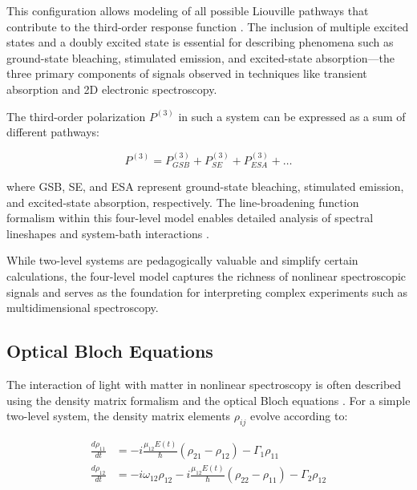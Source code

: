 \noindent This configuration allows modeling of all possible Liouville pathways that contribute to the third-order response function \cite{Mukamel1995PrinciplesNonlinearOptical}. The inclusion of multiple excited states and a doubly excited state is essential for describing phenomena such as ground-state bleaching, stimulated emission, and excited-state absorption—the three primary components of signals observed in techniques like transient absorption and 2D electronic spectroscopy.

\noindent The third-order polarization $P^{(3)}$ in such a system can be expressed as a sum of different pathways:

\begin{equation}
    P^{(3)} = P^{(3)}_{GSB} + P^{(3)}_{SE} + P^{(3)}_{ESA} + \ldots
    \label{eq:third_order_contributions}
\end{equation}

\noindent where GSB, SE, and ESA represent ground-state bleaching, stimulated emission, and excited-state absorption, respectively. The line-broadening function formalism within this four-level model enables detailed analysis of spectral lineshapes and system-bath interactions \cite{Cho2009TwodimensionalOpticalSpectroscopy, AbramaviciusEtAl2009CoherentMultidimensionalOptical}.

\noindent While two-level systems are pedagogically valuable and simplify certain calculations, the four-level model captures the richness of nonlinear spectroscopic signals and serves as the foundation for interpreting complex experiments such as multidimensional spectroscopy.

\subsection{Optical Bloch Equations}
\label{subsec:optical_bloch}

\noindent The interaction of light with matter in nonlinear spectroscopy is often described using the density matrix formalism and the optical Bloch equations \cite{TanimuraMukamel1993TwodimensionalFemtosecondVibrational}. For a simple two-level system, the density matrix elements $\rho_{ij}$ evolve according to:

\begin{align}
    \frac{d\rho_{11}}{dt} & = -i\frac{\mu_{12}E(t)}{\hbar}(\rho_{21} - \rho_{12}) - \Gamma_1 \rho_{11} \label{eq:bloch_population}                        \\
    \frac{d\rho_{12}}{dt} & = -i\omega_{12}\rho_{12} - i\frac{\mu_{12}E(t)}{\hbar}(\rho_{22} - \rho_{11}) - \Gamma_2 \rho_{12} \label{eq:bloch_coherence}
\end{align}

